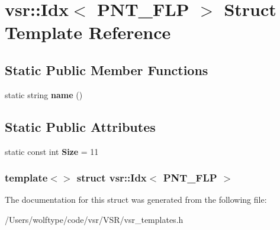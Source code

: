 \hypertarget{structvsr_1_1_idx_3_01_p_n_t___f_l_p_01_4}{\section{vsr\-:\-:Idx$<$ P\-N\-T\-\_\-\-F\-L\-P $>$ Struct Template Reference}
\label{structvsr_1_1_idx_3_01_p_n_t___f_l_p_01_4}
}
\subsection*{Static Public Member Functions}
\begin{DoxyCompactItemize}
\item 
\hypertarget{structvsr_1_1_idx_3_01_p_n_t___f_l_p_01_4_af375aa664214a491af1c05fecc9ab4b7}{static string {\bfseries name} ()}\label{structvsr_1_1_idx_3_01_p_n_t___f_l_p_01_4_af375aa664214a491af1c05fecc9ab4b7}

\end{DoxyCompactItemize}
\subsection*{Static Public Attributes}
\begin{DoxyCompactItemize}
\item 
\hypertarget{structvsr_1_1_idx_3_01_p_n_t___f_l_p_01_4_aa3fc7670c2ca031aff7cf4fd9ab61274}{static const int {\bfseries Size} = 11}\label{structvsr_1_1_idx_3_01_p_n_t___f_l_p_01_4_aa3fc7670c2ca031aff7cf4fd9ab61274}

\end{DoxyCompactItemize}
\subsubsection*{template$<$$>$ struct vsr\-::\-Idx$<$ P\-N\-T\-\_\-\-F\-L\-P $>$}



The documentation for this struct was generated from the following file\-:\begin{DoxyCompactItemize}
\item 
/\-Users/wolftype/code/vsr/\-V\-S\-R/vsr\-\_\-templates.\-h\end{DoxyCompactItemize}
